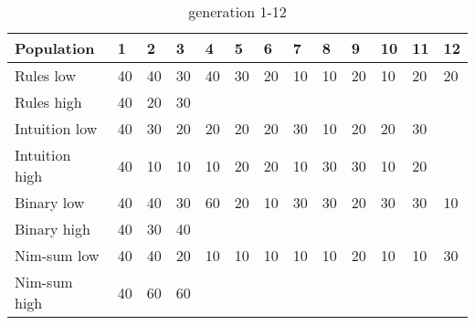 \begin{table}
	\begin{subtable}{\linewidth}
	\centering
		\begin{tabular}{lllllllllllll}\hline
		Population & 1 & 2 & 3 & 4 & 5 & 6 & 7 & 8 & 9 & 10 & 11 & 12\\\hline
		Rules low & 40 & 40 & 30 & 40 & 30 & 20 & 10 & 10 & 20 & 10 & 20 & 20\\
		Rules high & 40 & 20 & 30 & \textemdash & \textemdash & \textemdash & \textemdash & \textemdash & \textemdash & \textemdash & \textemdash & \textemdash\\
		Intuition low & 40 & 30 & 20 & 20 & 20 & 20 & 30 & 10 & 20 & 20 & 30 & \textemdash\\
		Intuition high & 40 & 10 & 10 & 10 & 20 & 20 & 10 & 30 & 30 & 10 & 20 & \textemdash\\
		Binary low & 40 & 40 & 30 & 60 & 20 & 10 & 30 & 30 & 20 & 30 & 30 & 10\\
		Binary high & 40 & 30 & 40 & \textemdash & \textemdash & \textemdash & \textemdash & \textemdash & \textemdash & \textemdash & \textemdash & \textemdash\\
		Nim-sum low & 40 & 40 & 20 & 10 & 10 & 10 & 10 & 10 & 20 & 10 & 10 & 30\\
		Nim-sum high & 40 & 60 & 60 & \textemdash & \textemdash & \textemdash & \textemdash & \textemdash & \textemdash & \textemdash & \textemdash & \textemdash\\
		\end{tabular}
	\caption{generation 1-12}
	\end{subtable}


\end{table}
